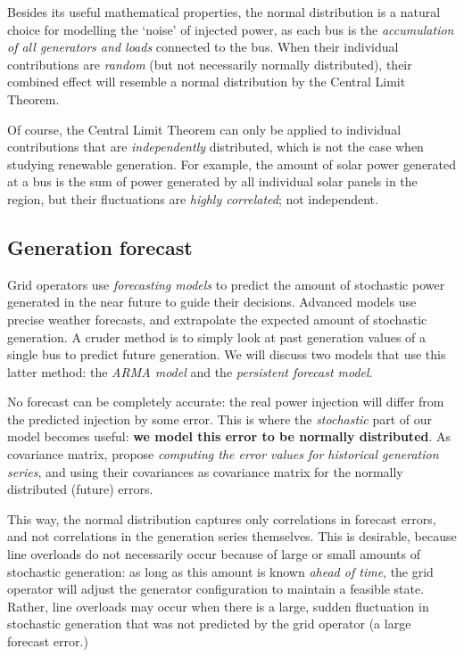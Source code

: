 \documentclass[main.tex]{subfiles}
\begin{document}
%
Besides its useful mathematical properties, the normal distribution is a natural choice for modelling the `noise' of injected power, as each bus is the \emph{accumulation of all generators and loads} connected to the bus. When their individual contributions are \emph{random} (but not necessarily normally distributed), their combined effect will resemble a normal distribution by the Central Limit Theorem. 

Of course, the Central Limit Theorem can only be applied to individual contributions that are \emph{independently} distributed, which is not the case when studying renewable generation. For example, the amount of solar power generated at a bus is the sum of power generated by all individual solar panels in the region, but their fluctuations are \emph{highly correlated}; not independent.

\subsection{Generation forecast}\label{sec:generationforecast}
Grid operators use \emph{forecasting models} to predict the amount of stochastic power generated in the near future to guide their decisions. Advanced models use precise weather forecasts, and extrapolate the expected amount of stochastic generation. A cruder method is to simply look at past generation values of a single bus to predict future generation. We will discuss two models that use this latter method: the \emph{ARMA model} and the \emph{persistent forecast model}.

No forecast can be completely accurate: the real power injection will differ from the predicted injection by some error. This is where the \emph{stochastic} part of our model becomes useful: \textbf{we model this error to be normally distributed}. As covariance matrix, \cite{Nesti2018emergentfailures} propose \emph{computing the error values for historical generation series}, and using their covariances as covariance matrix for the normally distributed (future) errors.

This way, the normal distribution captures only correlations in forecast errors, and not correlations in the generation series themselves. This is desirable, because line overloads do not necessarily occur because of large or small amounts of stochastic generation: as long as this amount is known \emph{ahead of time}, the grid operator will adjust the generator configuration to maintain a feasible state. Rather, line overloads may occur when there is a large, sudden fluctuation in stochastic generation that was not predicted by the grid operator (\ie a large forecast error.)
\end{document}
